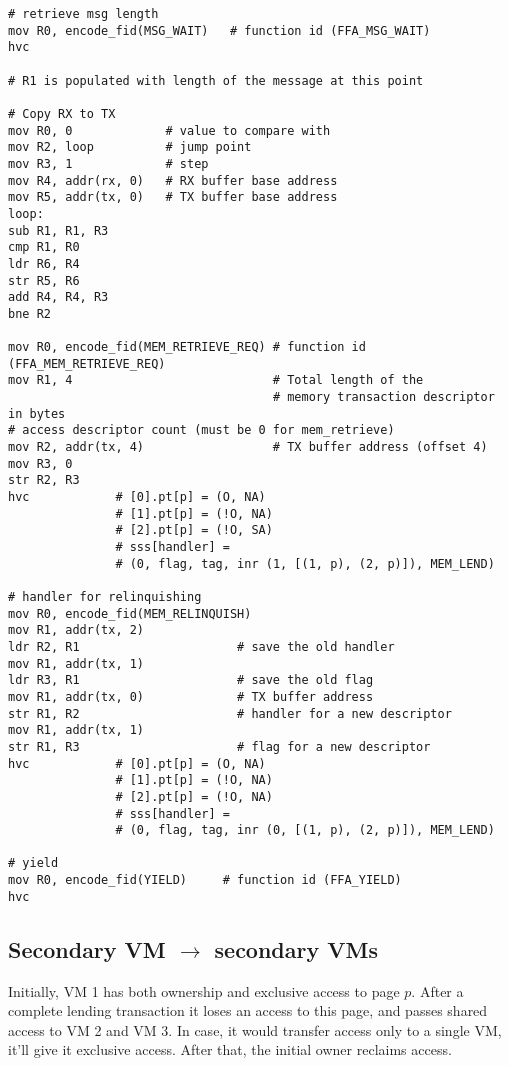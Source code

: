 \documentclass{article}
\begin{document}
\begin{lstlisting}[caption={VM 2}]
# retrieve msg length
mov R0, encode_fid(MSG_WAIT)   # function id (FFA_MSG_WAIT)
hvc

# R1 is populated with length of the message at this point

# Copy RX to TX
mov R0, 0             # value to compare with
mov R2, loop          # jump point
mov R3, 1             # step
mov R4, addr(rx, 0)   # RX buffer base address
mov R5, addr(tx, 0)   # TX buffer base address
loop:
sub R1, R1, R3
cmp R1, R0
ldr R6, R4
str R5, R6
add R4, R4, R3
bne R2

mov R0, encode_fid(MEM_RETRIEVE_REQ) # function id (FFA_MEM_RETRIEVE_REQ)
mov R1, 4                            # Total length of the  
                                     # memory transaction descriptor in bytes
# access descriptor count (must be 0 for mem_retrieve)
mov R2, addr(tx, 4)                  # TX buffer address (offset 4)
mov R3, 0
str R2, R3                                    
hvc            # [0].pt[p] = (O, NA)
               # [1].pt[p] = (!O, NA)
               # [2].pt[p] = (!O, SA)
               # sss[handler] = 
               # (0, flag, tag, inr (1, [(1, p), (2, p)]), MEM_LEND)

# handler for relinquishing
mov R0, encode_fid(MEM_RELINQUISH)
mov R1, addr(tx, 2)
ldr R2, R1                      # save the old handler
mov R1, addr(tx, 1)
ldr R3, R1                      # save the old flag
mov R1, addr(tx, 0)             # TX buffer address
str R1, R2                      # handler for a new descriptor
mov R1, addr(tx, 1)
str R1, R3                      # flag for a new descriptor
hvc            # [0].pt[p] = (O, NA)
               # [1].pt[p] = (!O, NA)
               # [2].pt[p] = (!O, NA)
               # sss[handler] = 
               # (0, flag, tag, inr (0, [(1, p), (2, p)]), MEM_LEND)

# yield
mov R0, encode_fid(YIELD)     # function id (FFA_YIELD)
hvc
\end{lstlisting}

\subsection{Secondary VM $\rightarrow$ secondary VMs}

Initially, VM 1 has both ownership and exclusive access to page $p$. After a complete lending transaction it loses an access to this page, and passes shared access to VM 2 and VM 3. In case, it would transfer access only to a single VM, it'll give it exclusive access. After that, the initial owner reclaims access.
\end{document}

